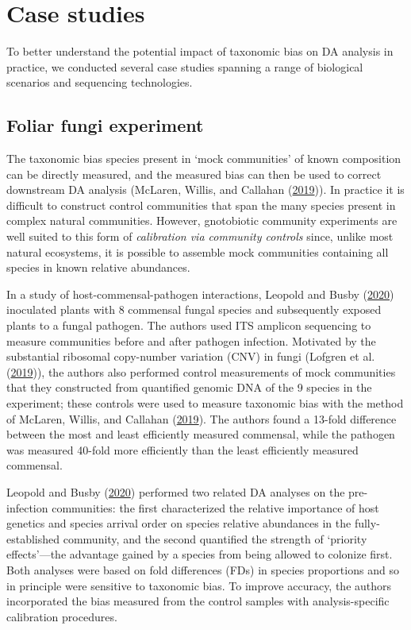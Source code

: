 \documentclass[
]{article}
\begin{document}
\hypertarget{case-studies}{%
\section{Case studies ~}\label{case-studies}}

To better understand the potential impact of taxonomic bias on DA analysis in practice, we conducted several case studies spanning a range of biological scenarios and sequencing technologies.

\hypertarget{foliar-fungi-experiment}{%
\subsection{Foliar fungi experiment}\label{foliar-fungi-experiment}}

The taxonomic bias species present in `mock communities' of known composition can be directly measured, and the measured bias can then be used to correct downstream DA analysis (McLaren, Willis, and Callahan (\protect\hyperlink{ref-mclaren2019cons}{2019})).
In practice it is difficult to construct control communities that span the many species present in complex natural communities.
However, gnotobiotic community experiments are well suited to this form of \emph{calibration via community controls} since, unlike most natural ecosystems, it is possible to assemble mock communities containing all species in known relative abundances.

In a study of host-commensal-pathogen interactions, Leopold and Busby (\protect\hyperlink{ref-leopold2020host}{2020}) inoculated plants with 8 commensal fungal species and subsequently exposed plants to a fungal pathogen.
The authors used ITS amplicon sequencing to measure communities before and after pathogen infection.
Motivated by the substantial ribosomal copy-number variation (CNV) in fungi (Lofgren et al. (\protect\hyperlink{ref-lofgren2019geno}{2019})), the authors also performed control measurements of mock communities that they constructed from quantified genomic DNA of the 9 species in the experiment; these controls were used to measure taxonomic bias with the method of McLaren, Willis, and Callahan (\protect\hyperlink{ref-mclaren2019cons}{2019}).
The authors found a 13-fold difference between the most and least efficiently measured commensal, while the pathogen was measured 40-fold more efficiently than the least efficiently measured commensal.

Leopold and Busby (\protect\hyperlink{ref-leopold2020host}{2020}) performed two related DA analyses on the pre-infection communities: the first characterized the relative importance of host genetics and species arrival order on species relative abundances in the fully-established community, and the second quantified the strength of `priority effects'---the advantage gained by a species from being allowed to colonize first.
Both analyses were based on fold differences (FDs) in species proportions and so in principle were sensitive to taxonomic bias.
To improve accuracy, the authors incorporated the bias measured from the control samples with analysis-specific calibration procedures.
\end{document}
